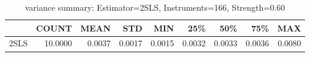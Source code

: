 \begin{table}[ht]
\centering
\caption{variance summary: Estimator=2SLS, Instruments=166, Strength=0.60}
\begin{tabular}{lrrrrrrrr}
\toprule
 & COUNT & MEAN & STD & MIN & 25\% & 50\% & 75\% & MAX \\
\midrule
2SLS & 10.0000 & 0.0037 & 0.0017 & 0.0015 & 0.0032 & 0.0033 & 0.0036 & 0.0080 \\
\bottomrule
\end{tabular}
\end{table}
